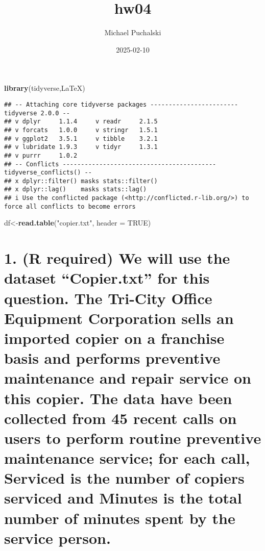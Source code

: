 \documentclass[
]{article}
\title{hw04}
\author{Michael Puchalski}
\date{2025-02-10}
\newenvironment{Shaded}{\begin{snugshade}}{\end{snugshade}}
\newcommand{\AttributeTok}[1]{\textcolor[rgb]{0.13,0.29,0.53}{#1}}
\newcommand{\ConstantTok}[1]{\textcolor[rgb]{0.56,0.35,0.01}{#1}}
\newcommand{\FunctionTok}[1]{\textcolor[rgb]{0.13,0.29,0.53}{\textbf{#1}}}
\newcommand{\NormalTok}[1]{#1}
\newcommand{\OtherTok}[1]{\textcolor[rgb]{0.56,0.35,0.01}{#1}}
\newcommand{\StringTok}[1]{\textcolor[rgb]{0.31,0.60,0.02}{#1}}
\begin{document}
\maketitle

\begin{Shaded}
\begin{Highlighting}[]
\FunctionTok{library}\NormalTok{(tidyverse,LaTeX)}
\end{Highlighting}
\end{Shaded}

\begin{verbatim}
## -- Attaching core tidyverse packages ------------------------ tidyverse 2.0.0 --
## v dplyr     1.1.4     v readr     2.1.5
## v forcats   1.0.0     v stringr   1.5.1
## v ggplot2   3.5.1     v tibble    3.2.1
## v lubridate 1.9.3     v tidyr     1.3.1
## v purrr     1.0.2     
## -- Conflicts ------------------------------------------ tidyverse_conflicts() --
## x dplyr::filter() masks stats::filter()
## x dplyr::lag()    masks stats::lag()
## i Use the conflicted package (<http://conflicted.r-lib.org/>) to force all conflicts to become errors
\end{verbatim}

\begin{Shaded}
\begin{Highlighting}[]
\NormalTok{df}\OtherTok{\textless{}{-}}\FunctionTok{read.table}\NormalTok{(}\StringTok{"copier.txt"}\NormalTok{, }\AttributeTok{header =} \ConstantTok{TRUE}\NormalTok{)}
\end{Highlighting}
\end{Shaded}

\section{1. (R required) We will use the dataset ``Copier.txt'' for this
question. The Tri-City Office Equipment Corporation sells an imported
copier on a franchise basis and performs preventive maintenance and
repair service on this copier. The data have been collected from 45
recent calls on users to perform routine preventive maintenance service;
for each call, Serviced is the number of copiers serviced and Minutes is
the total number of minutes spent by the service
person.}\label{r-required-we-will-use-the-dataset-copier.txt-for-this-question.-the-tri-city-office-equipment-corporation-sells-an-imported-copier-on-a-franchise-basis-and-performs-preventive-maintenance-and-repair-service-on-this-copier.-the-data-have-been-collected-from-45-recent-calls-on-users-to-perform-routine-preventive-maintenance-service-for-each-call-serviced-is-the-number-of-copiers-serviced-and-minutes-is-the-total-number-of-minutes-spent-by-the-service-person.}
\end{document}
